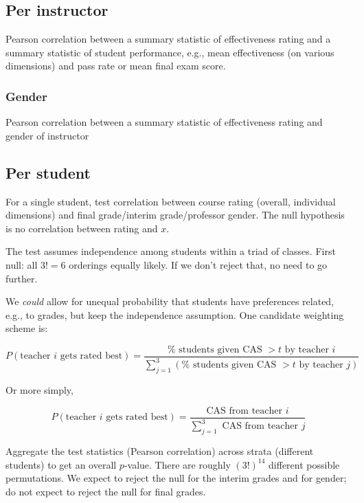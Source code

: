 \documentclass[12pt]{article}
\newcommand{\todo}[1]{{\color{red}{TO DO: \sc #1}}}
\begin{document}
\subsection{Per instructor}
Pearson correlation between a summary statistic of effectiveness rating and a summary statistic
of student performance, e.g., mean effectiveness (on various dimensions) and pass rate or mean
final exam score.
\todo{code is ready.  Do we do all metrics?}

\subsubsection{Gender}
Pearson correlation between a summary statistic of effectiveness rating and gender of instructor
\todo{code is ready.  Do we do all metrics?}

\subsection{Per student}
For a single student, test correlation between course rating (overall, individual dimensions) and final grade/interim grade/professor gender.
The null hypothesis is no correlation between rating and $x$.

The test assumes independence among students within a triad of classes.
First null: all $3! = 6$ orderings equally likely.
If we don't reject that, no need to go further.

We \emph{could} allow for unequal probability that students have preferences
related, e.g., to grades, but keep the independence assumption.
One candidate weighting scheme is:

$$P(\text{teacher $i$ gets rated best}) = \frac{\%\text{ students given CAS }> t\text{ by teacher $i$}}{\sum_{j=1}^3(\%\text{ students given CAS }> t\text{ by teacher }j)}$$
 
Or more simply, 

   $$P(\text{teacher $i$ gets rated best}) = 
   \frac{\text{CAS from teacher $i$}}{\sum_{j=1}^3\text{ CAS from teacher }j}
   $$
   
Aggregate the test statistics (Pearson correlation) across strata (different students) to get an overall $p$-value.  
There are roughly $(3!)^{14}$ different possible permutations.
We expect to reject the null for the interim grades and for gender; 
do not expect to reject the null for final grades.
\end{document}
